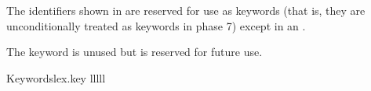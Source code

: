 \documentclass{wg21}
\begin{document}
\pnum
{}%
The identifiers shown in  are reserved for use
as keywords (that is, they are unconditionally treated as keywords in
phase 7) except in an .
\begin{note}
    The  keyword is unused but
    is reserved for future use.
\end{note}

\begin{multicolfloattable}{Keywords}{lex.key}
    {lllll}
     \\
     \\
     \\
     \\
     \\
     \\
     \\
     \\
     \\
     \\
     \\
     \\
     \\
     \\
     \\
     \\
     \\
    \columnbreak
     \\
     \\
     \\
     \\
     \\
     \\
     \\
     \\
     \\
     \\
     \\
     \\
     \\
     \\
     \\

\end{multicolfloattable}
\end{document}
